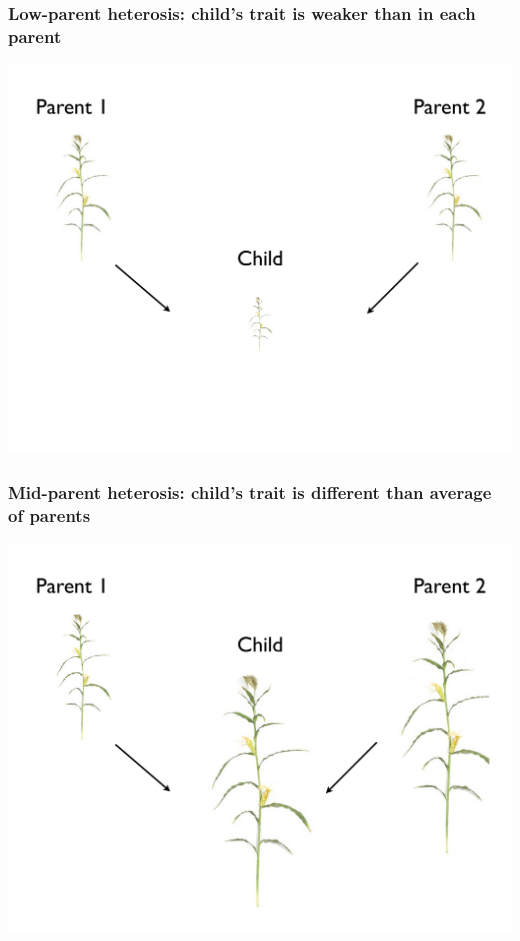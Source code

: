 \documentclass[handout]{beamer}
\numberwithin{equation}{section}
\begin{document}
\begin{frame}
\frametitle{Low-parent heterosis: child's trait is weaker than in each parent}
\begin{center}
\includegraphics[scale=.3]{fig/lph}
\end{center}
\end{frame}


\begin{frame}
\frametitle{Mid-parent heterosis: child's trait is different than average of parents}
\begin{center}
\includegraphics[scale=.3]{fig/mph}
\end{center}
\end{frame}
\end{document}
